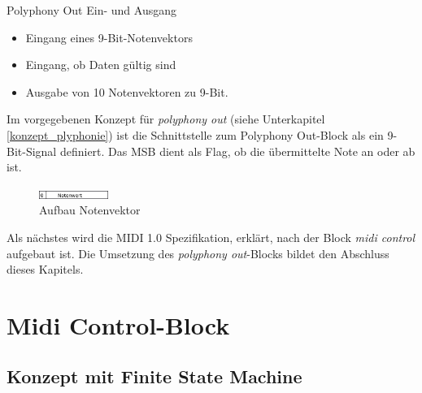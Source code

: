 Polyphony Out Ein- und Ausgang

\begin{itemize}
	\item Eingang eines 9-Bit-Notenvektors
    \item Eingang, ob Daten gültig sind
	\item Ausgabe von 10 Notenvektoren zu 9-Bit.
\end{itemize}
\bigskip

Im vorgegebenen Konzept für \textit{polyphony out} (siehe Unterkapitel \ref{konzept_plyphonie}) ist die Schnittstelle zum Polyphony Out-Block als ein 9-Bit-Signal definiert. Das MSB dient als Flag, ob die übermittelte Note an oder ab ist.

\begin{figure}[H]
	\includegraphics[width=0.2\textwidth]{images/midi_interface/NotenVektor.png}
	\caption{Aufbau Notenvektor}
	\label{fig.Notenvektor}
\end{figure}

Als nächstes wird die MIDI 1.0 Spezifikation, erklärt, nach der Block \textit{midi control} aufgebaut ist. Die Umsetzung des \textit{polyphony out}-Blocks bildet den Abschluss dieses Kapitels.




\newpage
\section{Midi Control-Block}\label{sect.midi_umsetzung}

\subsection{Konzept mit Finite State Machine}\label{anforderung_fsm}

